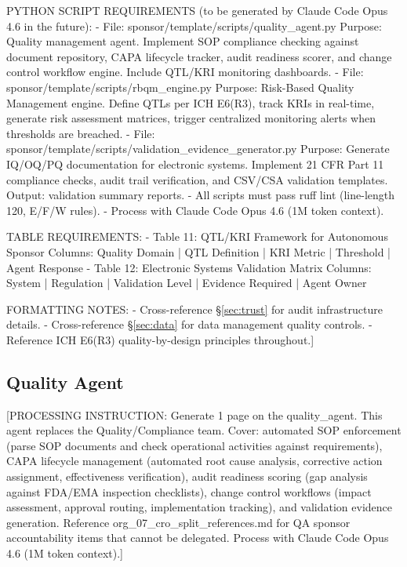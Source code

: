 PYTHON SCRIPT REQUIREMENTS (to be generated by Claude Code Opus 4.6 in the future):
- File: sponsor/template/scripts/quality\_agent.py
  Purpose: Quality management agent. Implement SOP compliance checking against
  document repository, CAPA lifecycle tracker, audit readiness scorer, and
  change control workflow engine. Include QTL/KRI monitoring dashboards.
- File: sponsor/template/scripts/rbqm\_engine.py
  Purpose: Risk-Based Quality Management engine. Define QTLs per ICH E6(R3),
  track KRIs in real-time, generate risk assessment matrices, trigger
  centralized monitoring alerts when thresholds are breached.
- File: sponsor/template/scripts/validation\_evidence\_generator.py
  Purpose: Generate IQ/OQ/PQ documentation for electronic systems. Implement
  21 CFR Part 11 compliance checks, audit trail verification, and CSV/CSA
  validation templates. Output: validation summary reports.
- All scripts must pass ruff lint (line-length 120, E/F/W rules).
- Process with Claude Code Opus 4.6 (1M token context).

TABLE REQUIREMENTS:
- Table 11: QTL/KRI Framework for Autonomous Sponsor
  Columns: Quality Domain | QTL Definition | KRI Metric | Threshold | Agent Response
- Table 12: Electronic Systems Validation Matrix
  Columns: System | Regulation | Validation Level | Evidence Required | Agent Owner

FORMATTING NOTES:
- Cross-reference \S\ref{sec:trust} for audit infrastructure details.
- Cross-reference \S\ref{sec:data} for data management quality controls.
- Reference ICH E6(R3) quality-by-design principles throughout.]

\subsection{Quality Agent}

[PROCESSING INSTRUCTION: Generate 1 page on the quality\_agent. This agent replaces the
Quality/Compliance team. Cover: automated SOP enforcement (parse SOP documents and check
operational activities against requirements), CAPA lifecycle management (automated root
cause analysis, corrective action assignment, effectiveness verification), audit readiness
scoring (gap analysis against FDA/EMA inspection checklists), change control workflows
(impact assessment, approval routing, implementation tracking), and validation evidence
generation. Reference org\_07\_cro\_split\_references.md for QA sponsor accountability items
that cannot be delegated. Process with Claude Code Opus 4.6 (1M token context).]

